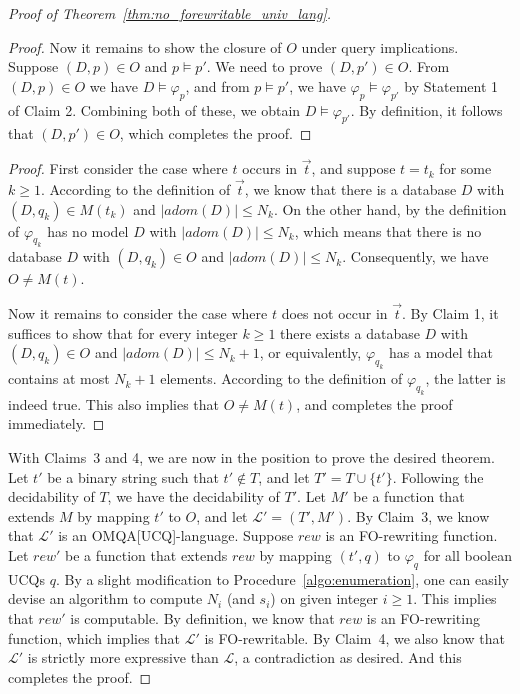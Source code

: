 \documentclass[letterpaper]{article} %
\theoremstyle{definition}
\theoremstyle{remark}
\theoremstyle{definition}
\begin{document}
\begin{proof}[Proof of Theorem~\ref{thm:no_forewritable_univ_lang}]
\begin{proof}
Now it remains to show the closure of $O$ under query implications. Suppose $(D,p)\in O$ and $p\vDash p'$. We need to prove $(D,p')\in O$. From $(D,p)\in O$ we have $D\models\varphi_p$, and from $p\vDash p'$, we have $\varphi_p\vDash\varphi_{p'}$ by Statement 1 of Claim 2. Combining both of these, we obtain $D\models\varphi_{p'}$. By definition, it follows that $(D,p')\in O$, which completes the proof. 
\end{proof}


\medskip
{}
\medskip

\begin{proof}
First consider the case where $t$ occurs in $\vec{t}$, and suppose $t=t_k$ for some $k\ge 1$. 
According to the definition of $\vec{t}$, we know that there is a database $D$ with $(D,q_k)\in M(t_k)$ and $|adom(D)|\le N_k$. On the other hand, by the definition of $\varphi_{q_k}$ has no model $D$ with $|adom(D)|\le N_k$, which means that there is no database $D$ with $(D,q_k)\in O$ and $|adom(D)|\le N_k$. Consequently, we have $O\ne M(t)$.

Now it remains to consider the case where $t$ does not occur in $\vec{t}$. By Claim 1, it suffices to show that for every integer $k\ge 1$ there exists a database $D$ with $(D,q_k)\in O$ and $|adom(D)|\le N_k+1$, or equivalently, $\varphi_{q_k}$ has a model that contains at most $N_k+1$ elements. According to the definition of $\varphi_{q_k}$, the latter is indeed true. This also implies that $O\ne M(t)$, and completes the proof immediately.
\end{proof}


With Claims~3 and 4, we are now in the position to prove the desired theorem. Let $t'$ be a binary string such that $t'\not\in T$, and let $T'=T\cup\{t'\}$. Following the decidability of $T$, we have the decidability of $T'$. Let $M'$ be a function that extends $M$ by mapping $t'$ to $O$, and let $\mathcal{L}'=(T',M')$. By Claim~3, we know that $\mathcal{L}'$ is an OMQA[UCQ]-language. Suppose $rew$ is an FO-rewriting function. Let $rew'$ be a function that extends $rew$ by mapping $(t',q)$ to $\varphi_q$ for all boolean UCQs $q$. By a slight modification to Procedure~\ref{algo:enumeration}, one can easily devise an algorithm to compute $N_i$ (and $s_i$) on given integer $i\ge 1$. This implies that $rew'$ is computable. By definition, we know that $rew$ is an FO-rewriting function, which implies that $\mathcal{L}'$ is FO-rewritable. By Claim~4, we also know that $\mathcal{L}'$ is strictly more expressive than $\mathcal{L}$, a contradiction as desired. And this completes the proof. 
\end{proof}
\end{document}
